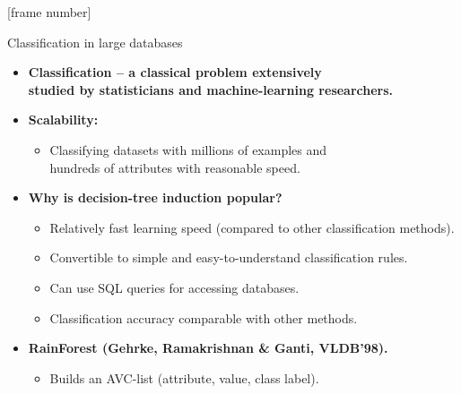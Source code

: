 \documentclass[aspectratio=169,t,table]{beamer}
\begin{document}
  {
    [frame number]
    \begin{frame}{Classification in large databases}
      \begin{itemize}
        \item \textbf{Classification -- a classical problem extensively \\ studied by statisticians and machine-learning researchers.}
        \item \textbf{Scalability:}
        \begin{itemize}
          \item Classifying datasets with millions of examples and \\ hundreds of attributes with reasonable speed.
        \end{itemize}
        \item \textbf{Why is decision-tree induction popular?}
        \begin{itemize}
          \item Relatively fast learning speed (compared to other classification methods).
          \item Convertible to simple and easy-to-understand classification rules.
          \item Can use SQL queries for accessing databases.
          \item Classification accuracy comparable with other methods.
        \end{itemize}
        \item \textbf{RainForest (Gehrke, Ramakrishnan \& Ganti, VLDB'98).}
        \begin{itemize}
          \item Builds an AVC-list (attribute, value, class label).
        \end{itemize}
      \end{itemize}
    \end{frame}
  }
\end{document}

